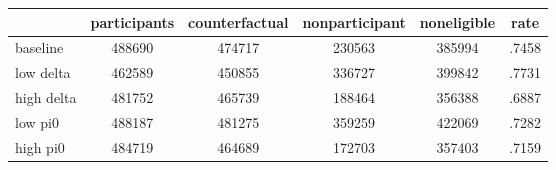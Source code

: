 \begin{table}[htbp]
\begin{tabular}{lccccc} \hline \hline
 & participants  & counterfactual  & nonparticipant  & noneligible  & rate  \\  \hline 
baseline &    488690 &    474717 &    230563 &    385994 &     .7458 \\  
low delta &    462589 &    450855 &    336727 &    399842 &     .7731 \\  
high delta &    481752 &    465739 &    188464 &    356388 &     .6887 \\  
low pi0 &    488187 &    481275 &    359259 &    422069 &     .7282 \\  
high pi0 &    484719 &    464689 &    172703 &    357403 &     .7159 \\  
\hline \hline \end{tabular}
\end{table}
